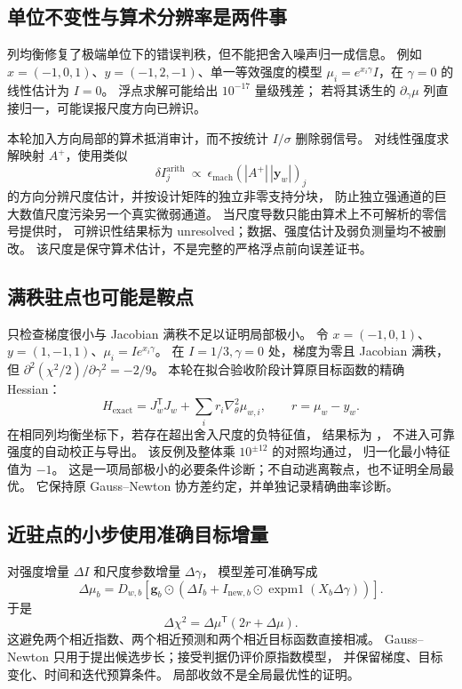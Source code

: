 \documentclass[UTF8,11pt,a4paper,fontset=fandol]{ctexart}
\newcommand{\T}{^{\mathsf T}}
\begin{document}
\subsection{单位不变性与算术分辨率是两件事}

列均衡修复了极端单位下的错误判秩，但不能把舍入噪声归一成信息。
例如 $x=(-1,0,1)$、$y=(-1,2,-1)$、单一等效强度的模型
$\mu_i=e^{x_i\gamma}I$，在 $\gamma=0$ 的线性估计为 $I=0$。
浮点求解可能给出 $10^{-17}$ 量级残差；
若将其诱生的 $\partial_\gamma\mu$ 列直接归一，可能误报尺度方向已辨识。

本轮加入方向局部的算术抵消审计，而不按统计 $I/\sigma$ 删除弱信号。
对线性强度求解映射 $A^+$，使用类似
\begin{equation}
\delta I_j^{\mathrm{arith}}
\ \propto\ \epsilon_{\mathrm{mach}}
\left(|A^+|\,|\bm y_w|\right)_j
\end{equation}
的方向分辨尺度估计，并按设计矩阵的独立非零支持分块，
防止独立强通道的巨大数值尺度污染另一个真实微弱通道。
当尺度导数只能由算术上不可解析的零信号提供时，
可辨识性结果标为 unresolved；数据、强度估计及弱负测量均不被删改。
该尺度是保守算术估计，不是完整的严格浮点前向误差证书。

\subsection{满秩驻点也可能是鞍点}

只检查梯度很小与 Jacobian 满秩不足以证明局部极小。
令 $x=(-1,0,1)$、$y=(1,-1,1)$、$\mu_i=I e^{x_i\gamma}$。
在 $I=1/3,\gamma=0$ 处，梯度为零且 Jacobian 满秩，
但 $\partial^2(\chi^2/2)/\partial\gamma^2=-2/9$。
本轮在拟合验收阶段计算原目标函数的精确 Hessian：
\begin{equation}
H_{\mathrm{exact}}=J_w\T J_w+
\sum_i r_i\nabla_\theta^2\mu_{w,i},\qquad r=\mu_w-y_w.
\end{equation}
在相同列均衡坐标下，若存在超出舍入尺度的负特征值，
结果标为 ，
不进入可靠强度的自动校正与导出。
该反例及整体乘 $10^{\pm12}$ 的对照均通过，
归一化最小特征值为 $-1$。
这是一项局部极小的必要条件诊断；不自动逃离鞍点，也不证明全局最优。
它保持原 Gauss--Newton 协方差约定，并单独记录精确曲率诊断。

\subsection{近驻点的小步使用准确目标增量}

对强度增量 $\Delta I$ 和尺度参数增量 $\Delta\gamma$，
模型差可准确写成
\begin{equation}
\Delta\mu_b=D_{w,b}\!
\left[\bm g_b\odot
\left(\Delta I_b+
I_{\mathrm{new},b}\odot
\operatorname{expm1}(X_b\Delta\gamma)\right)\right].
\end{equation}
于是
\begin{equation}
\Delta\chi^2=\Delta\mu\T(2r+\Delta\mu).
\end{equation}
这避免两个相近指数、两个相近预测和两个相近目标函数直接相减。
Gauss--Newton 只用于提出候选步长；接受判据仍评价原指数模型，
并保留梯度、目标变化、时间和迭代预算条件。
局部收敛不是全局最优性的证明\cite{scipyLS}。
\end{document}
